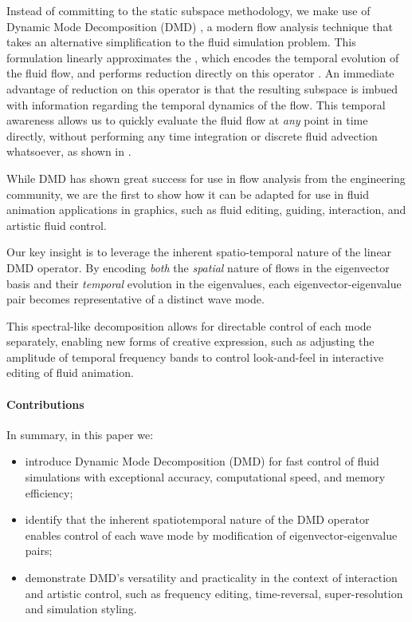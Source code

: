 Instead of committing to the static subspace methodology, we make use of Dynamic Mode Decomposition (DMD) \cite{schmid2010dynamic}, a modern flow analysis technique that takes an alternative simplification to the fluid simulation problem.
% 
This formulation linearly approximates the \emph{\koopman{}},  which encodes the temporal evolution of the fluid flow, and performs reduction directly on this operator \cite{schmid2010dynamic}.
%
An immediate advantage of reduction on this operator is that the resulting subspace is imbued with information regarding the temporal dynamics of the flow.
%
This temporal awareness allows us to quickly evaluate the fluid flow at \emph{any} point in time directly, without performing any time integration or discrete fluid advection whatsoever, as shown in .

While DMD has shown great success for use in flow analysis from the engineering community, 
we are the first to show how it can be adapted for use in fluid animation applications in graphics, such as fluid editing, guiding, interaction, and artistic fluid control. 
%

Our key insight is to leverage the inherent spatio-temporal nature of the linear DMD operator. By encoding \emph{both} the \emph{spatial} nature of flows in the eigenvector basis and their \emph{temporal} evolution in the eigenvalues, each eigenvector-eigenvalue pair becomes representative of a distinct wave mode. 

This spectral-like decomposition allows for directable control of each mode separately, enabling new forms of creative expression, such as adjusting the amplitude of temporal frequency bands to control look-and-feel in interactive editing of fluid animation. 

\paragraph{Contributions}
In summary, in this paper we:
\begin{itemize}
    \item introduce Dynamic Mode Decomposition (DMD) for fast control of fluid simulations with exceptional accuracy, computational speed, and memory efficiency;
    \item identify that the inherent spatiotemporal nature of the DMD operator enables control of each wave mode by modification of eigenvector-eigenvalue pairs;
    \item demonstrate DMD's versatility and practicality in the context of interaction and artistic control, such as frequency editing, time-reversal, super-resolution and simulation styling.
\end{itemize}